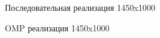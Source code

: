 \documentclass{report}
\begin{document}
\begin{figure}[H]
\caption{Последовательная реализация 1450x1000}
\end{figure}

\begin{figure}[H]
\caption{OMP реализация 1450x1000}
\end{figure}
\end{document}
